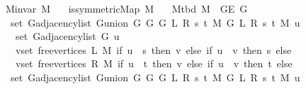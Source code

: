 \begin{isabellebody}
\ \ \ {\isachardoublequoteopen}M{\isachardot}{\kern0pt}invar\ M{\isachardoublequoteclose}\isanewline
\ \ \ {\isachardoublequoteopen}is{\isacharunderscore}{\kern0pt}symmetric{\isacharunderscore}{\kern0pt}Map\ M{\isachardoublequoteclose}\isanewline
\ \ \ {\isachardoublequoteopen}M{\isacharunderscore}{\kern0pt}tbd\ M\ {\isasymsubseteq}\ G{\isachardot}{\kern0pt}E\ G{\isachardoublequoteclose}\isanewline
\ \ \isanewline
\ \ \ \ {\isachardoublequoteopen}set\ {\isacharparenleft}{\kern0pt}G{\isachardot}{\kern0pt}adjacency{\isacharunderscore}{\kern0pt}list\ {\isacharparenleft}{\kern0pt}G{\isachardot}{\kern0pt}union\ {\isacharparenleft}{\kern0pt}G{}\ G\ {\isacharparenleft}{\kern0pt}G{}\ L\ R\ s\ t\ M{\isacharparenright}{\kern0pt}{\isacharparenright}{\kern0pt}\ {\isacharparenleft}{\kern0pt}G{}\ L\ R\ s\ t\ M{\isacharparenright}{\kern0pt}{\isacharparenright}{\kern0pt}\ u{\isacharparenright}{\kern0pt}\ {\isacharequal}{\kern0pt}\isanewline
\ \ \ \ \ set\ {\isacharparenleft}{\kern0pt}G{\isachardot}{\kern0pt}adjacency{\isacharunderscore}{\kern0pt}list\ G\ u{\isacharparenright}{\kern0pt}\ {\isasymunion}\isanewline
\ \ \ \ \ {\isacharparenleft}{\kern0pt}{\isasymUnion}v{\isasymin}set\ {\isacharparenleft}{\kern0pt}free{\isacharunderscore}{\kern0pt}vertices\ L\ M{\isacharparenright}{\kern0pt}{\isachardot}{\kern0pt}\ if\ u\ {\isacharequal}{\kern0pt}\ s\ then\ {\isacharbraceleft}{\kern0pt}v{\isacharbraceright}{\kern0pt}\ else\ if\ u\ {\isacharequal}{\kern0pt}\ v\ then\ {\isacharbraceleft}{\kern0pt}s{\isacharbraceright}{\kern0pt}\ else\ {\isacharbraceleft}{\kern0pt}{\isacharbraceright}{\kern0pt}{\isacharparenright}{\kern0pt}\ {\isasymunion}\isanewline
\ \ \ \ \ {\isacharparenleft}{\kern0pt}{\isasymUnion}v{\isasymin}set\ {\isacharparenleft}{\kern0pt}free{\isacharunderscore}{\kern0pt}vertices\ R\ M{\isacharparenright}{\kern0pt}{\isachardot}{\kern0pt}\ if\ u\ {\isacharequal}{\kern0pt}\ t\ then\ {\isacharbraceleft}{\kern0pt}v{\isacharbraceright}{\kern0pt}\ else\ if\ u\ {\isacharequal}{\kern0pt}\ v\ then\ {\isacharbraceleft}{\kern0pt}t{\isacharbraceright}{\kern0pt}\ else\ {\isacharbraceleft}{\kern0pt}{\isacharbraceright}{\kern0pt}{\isacharparenright}{\kern0pt}{\isachardoublequoteclose}%
\endisataginvisible
{\isafoldinvisible}%
%
\isadeliminvisible
\isanewline
%
\endisadeliminvisible
%
\isadelimproof
%
\endisadelimproof
%
\isatagproof
{}\isamarkupfalse%
\ {\isacharminus}{\kern0pt}\isanewline
\ \ \isamarkupfalse%
\isanewline
\ \ \ \ {\isachardoublequoteopen}set\ {\isacharparenleft}{\kern0pt}G{\isachardot}{\kern0pt}adjacency{\isacharunderscore}{\kern0pt}list\ {\isacharparenleft}{\kern0pt}G{\isachardot}{\kern0pt}union\ {\isacharparenleft}{\kern0pt}G{}\ G\ {\isacharparenleft}{\kern0pt}G{}\ L\ R\ s\ t\ M{\isacharparenright}{\kern0pt}{\isacharparenright}{\kern0pt}\ {\isacharparenleft}{\kern0pt}G{}\ L\ R\ s\ t\ M{\isacharparenright}{\kern0pt}{\isacharparenright}{\kern0pt}\ u{\isacharparenright}{\kern0pt}\ {\isacharequal}{\kern0pt}\isanewline

\end{isabellebody}

